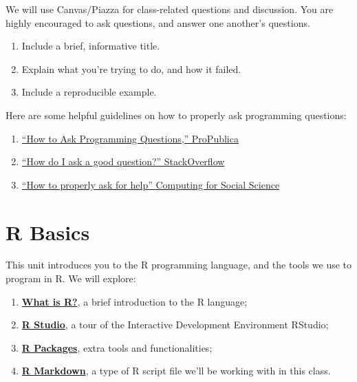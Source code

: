 \documentclass[]{book}
\providecommand{\tightlist}{%
  \setlength{\itemsep}{0pt}\setlength{\parskip}{0pt}}
\begin{document}
We will use Canvas/Piazza for class-related questions and discussion.
You are highly encouraged to ask questions, and answer one another's
questions.

\begin{enumerate}
\def\labelenumi{\arabic{enumi}.}
\tightlist
\item
  Include a brief, informative title.
\item
  Explain what you're trying to do, and how it failed.
\item
  Include a reproducible example.
\end{enumerate}

Here are some helpful guidelines on how to properly ask programming
questions:

\begin{enumerate}
\def\labelenumi{\arabic{enumi}.}
\tightlist
\item
  \href{https://www.propublica.org/nerds/how-to-ask-programming-questions}{``How
  to Ask Programming Questions,'' ProPublica}
\item
  \href{https://stackoverflow.com/help/how-to-ask}{``How do I ask a good
  question?'' StackOverflow}
\item
  \href{https://cfss.uchicago.edu/faq/asking-questions/}{``How to
  properly ask for help'' Computing for Social Science}
\end{enumerate}

\chapter{R Basics}\label{r-basics}

This unit introduces you to the R programming language, and the tools we
use to program in R. We will explore:

\begin{enumerate}
\def\labelenumi{\arabic{enumi}.}
\tightlist
\item
  \textbf{\protect\hyperlink{what-is-r}{What is R?}}, a brief
  introduction to the R language;
\item
  \textbf{\protect\hyperlink{r-studio-1}{R Studio}}, a tour of the
  Interactive Development Environment RStudio;
\item
  \textbf{\protect\hyperlink{r-packages-1}{R Packages}}, extra tools and
  functionalities;
\item
  \textbf{\protect\hyperlink{r-markdown}{R Markdown}}, a type of R
  script file we'll be working with in this class.
\end{enumerate}
\end{document}
